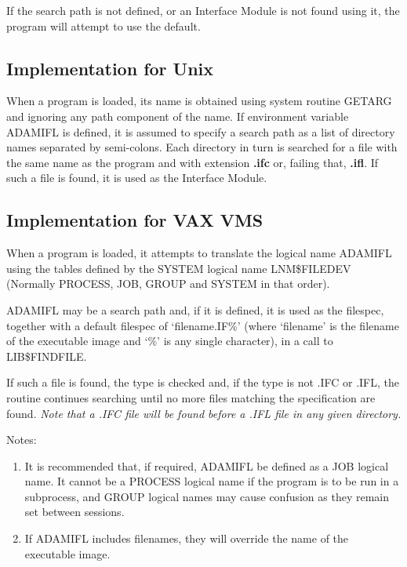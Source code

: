 \documentclass[twoside,11pt]{article}
\newcommand{\xlabel}[1]{}
\renewcommand{\_}{\texttt{\symbol{95}}}
\begin{document}
If the search path is not defined, or an Interface Module is not found using 
it, the program will attempt to use the default.

\subsection{Implementation for Unix\xlabel{implementation_for_unix}}

When a program is loaded, its name is obtained using system routine GETARG and
ignoring any path component of the name. 
If environment variable ADAM\_IFL is defined, it is
assumed to specify a search path as a list of directory names separated by
semi-colons.
Each directory in turn is searched for a file with the same name 
as the program and with extension {\bf .ifc} or, failing that, {\bf .ifl}. 
If such a file is found, it is used as the Interface Module.

\subsection{Implementation for VAX VMS\xlabel{implementation_for_vax_vms}}

When a program is loaded, it attempts to translate the logical name ADAM\_IFL 
using the tables defined by the SYSTEM logical name LNM\$FILE\_DEV (Normally
PROCESS, JOB, GROUP and SYSTEM in that order).

ADAM\_IFL may be a search path and, if it is defined, it is used as the 
filespec, together with a default filespec of `filename.IF\%' (where
`filename' is the filename of the executable image and `\%' is any single
character), in a call to LIB\$FIND\_FILE.

If such a file is found, the type is checked and, if the type is not .IFC
or .IFL, the routine continues searching until no more files matching 
the specification are found.
{\em Note that a .IFC file will be found before a .IFL file in any given
directory.}

Notes: 
\begin{enumerate}
\item It is recommended that, if required, ADAM\_IFL be defined as a JOB 
logical name.
It cannot be a PROCESS logical name if the program is to be run in a 
subprocess, and GROUP logical names may cause confusion as they remain set 
between sessions.
\item If ADAM\_IFL includes filenames, they will override the name of the 
executable image.
\end{enumerate}
\end{document}
